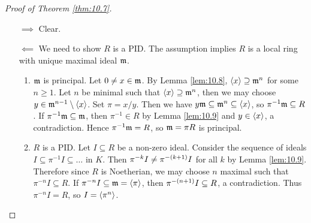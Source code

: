 \begin{proof}[Proof of Theorem \ref{thm:10.7}]
\hfill
\begin{itemize}
\item[$ \implies $] Clear.
\item[$ \impliedby $] We need to show $ R $ is a PID. The assumption implies $ R $ is a local ring with unique maximal ideal $ \mathfrak{m} $.
\begin{enumerate}[leftmargin=0.5in, label=Step \arabic*.]
\item $ \mathfrak{m} $ is principal. Let $ 0 \ne x \in \mathfrak{m} $. By Lemma \ref{lem:10.8}, $ \left\langle x \right\rangle \supseteq \mathfrak{m}^n $ for some $ n \ge 1 $. Let $ n $ be minimal such that $ \left\langle x \right\rangle \supseteq \mathfrak{m}^n $, then we may choose $ y \in \mathfrak{m}^{n - 1} \setminus \left\langle x \right\rangle $. Set $ \pi = x / y $. Then we have $ y\mathfrak{m} \subseteq \mathfrak{m}^n \subseteq \left\langle x \right\rangle $, so $ \pi^{-1}\mathfrak{m} \subseteq R $. If $ \pi^{-1}\mathfrak{m} \subseteq \mathfrak{m} $, then $ \pi^{-1} \in R $ by Lemma \ref{lem:10.9} and $ y \in \left\langle x \right\rangle $, a contradiction. Hence $ \pi^{-1}\mathfrak{m} = R $, so $ \mathfrak{m} = \pi R $ is principal.
\item $ R $ is a PID. Let $ I \subseteq R $ be a non-zero ideal. Consider the sequence of ideals $ I \subseteq \pi^{-1}I \subseteq \dots $ in $ K $. Then $ \pi^{-k}I \ne \pi^{-\br{k + 1}}I $ for all $ k $ by Lemma \ref{lem:10.9}. Therefore since $ R $ is Noetherian, we may choose $ n $ maximal such that $ \pi^{-n}I \subseteq R $. If $ \pi^{-n}I \subseteq \mathfrak{m} = \left\langle \pi \right\rangle $, then $ \pi^{-\br{n + 1}}I \subseteq R $, a contradiction. Thus $ \pi^{-n}I = R $, so $ I = \left\langle \pi^n \right\rangle $.
\end{enumerate}
\end{itemize}
\end{proof}

